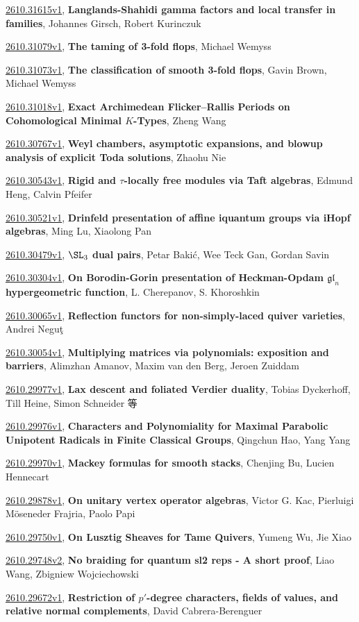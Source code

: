 \documentclass[9pt, a4paper]{article}
\theoremstyle{plain}
\theoremstyle{definition}
\theoremstyle{remark}
\newcommand{\arxiv}[3]{\href{https://arxiv.org/abs/#1}{#1}, \textbf{\textcolor{arxivblue}{#2}}, #3}
\begin{document}
\arxiv{2610.31615v1}{Langlands-Shahidi gamma factors and local transfer in families}{Johannes Girsch, Robert Kurinczuk}

\arxiv{2610.31079v1}{The taming of 3-fold flops}{Michael Wemyss}

\arxiv{2610.31073v1}{The classification of smooth 3-fold flops}{Gavin Brown, Michael Wemyss}

\arxiv{2610.31018v1}{Exact Archimedean Flicker--Rallis Periods on Cohomological Minimal $K$-Types}{Zheng Wang}

\arxiv{2610.30767v1}{Weyl chambers, asymptotic expansions, and blowup analysis of explicit Toda solutions}{Zhaohu Nie}

\arxiv{2610.30543v1}{Rigid and $τ$-locally free modules via Taft algebras}{Edmund Heng, Calvin Pfeifer}

\arxiv{2610.30521v1}{Drinfeld presentation of affine iquantum groups via iHopf algebras}{Ming Lu, Xiaolong Pan}

\arxiv{2610.30479v1}{$\SL_3$ dual pairs}{Petar Bakić, Wee Teck Gan, Gordan Savin}

\arxiv{2610.30304v1}{On Borodin-Gorin presentation of Heckman-Opdam $\mathfrak{gl}_n$ hypergeometric function}{L. Cherepanov, S. Khoroshkin}

\arxiv{2610.30065v1}{Reflection functors for non-simply-laced quiver varieties}{Andrei Neguţ}

\arxiv{2610.30054v1}{Multiplying matrices via polynomials: exposition and barriers}{Alimzhan Amanov, Maxim van den Berg, Jeroen Zuiddam}

\arxiv{2610.29977v1}{Lax descent and foliated Verdier duality}{Tobias Dyckerhoff, Till Heine, Simon Schneider 等}

\arxiv{2610.29976v1}{Characters and Polynomiality for Maximal Parabolic Unipotent Radicals in Finite Classical Groups}{Qingchun Hao, Yang Yang}

\arxiv{2610.29970v1}{Mackey formulas for smooth stacks}{Chenjing Bu, Lucien Hennecart}

\arxiv{2610.29878v1}{On unitary vertex operator algebras}{Victor G. Kac, Pierluigi Möseneder Frajria, Paolo Papi}

\arxiv{2610.29750v1}{On Lusztig Sheaves for Tame Quivers}{Yumeng Wu, Jie Xiao}

\arxiv{2610.29748v2}{No braiding for quantum sl2 reps - A short proof}{Liao Wang, Zbigniew Wojciechowski}

\arxiv{2610.29672v1}{Restriction of $p'$-degree characters, fields of values, and relative normal complements}{David Cabrera-Berenguer}
\end{document}
